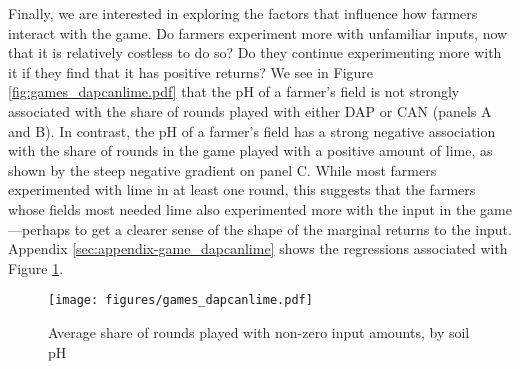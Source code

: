 \documentclass[12pt,letterpaper]{article}
\begin{document}
Finally, we are interested in exploring the factors that influence how farmers interact with the game. Do farmers experiment more with unfamiliar inputs, now that it is relatively costless to do so? Do they continue experimenting more with it if they find that it has positive returns? We see in Figure \ref{fig:games_dapcanlime.pdf} that the pH of a farmer's field is not strongly associated with the share of rounds played with either DAP or CAN (panels A and B). In contrast, the pH of a farmer's field has a strong negative association with the share of rounds in the game played with a positive amount of lime, as shown by the steep negative gradient on panel C. While most farmers experimented with lime in at least one round, this suggests that the farmers whose fields most needed lime also experimented more with the input in the game---perhaps to get a clearer sense of the shape of the marginal returns to the input. Appendix \ref{sec:appendix-game_dapcanlime} shows the regressions associated with Figure \ref{fig:games_dapcanlime}.

\begin{figure} [htbp]
\caption{Average share of rounds played with non-zero input amounts, by soil pH} 
\label{fig:games_dapcanlime}
\hspace{-.5cm} \centerline{\texttt{[image: figures/games\_dapcanlime.pdf]}}
 \end{figure}


% 
\end{document}
